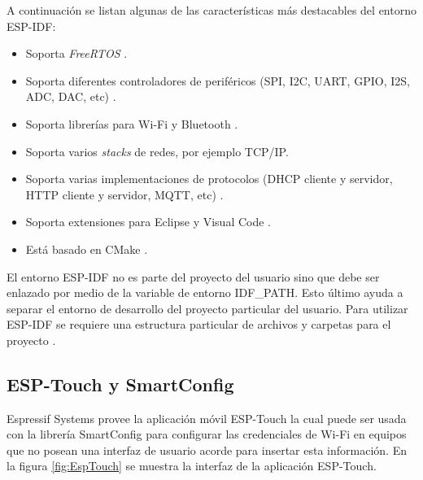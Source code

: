 A continuación se listan algunas de las características más destacables del entorno ESP-IDF:

\begin{itemize}
\item Soporta \textit{FreeRTOS} \citep{ESPIDF:FreeRTOS}.
\item Soporta diferentes controladores de periféricos (SPI, I2C, UART, GPIO, I2S, ADC, DAC, etc) \citep{ESPIDF:PER}.
\item Soporta librerías para Wi-Fi \citep{ESPIDF:WiFi} y Bluetooth \citep{ESPIDF:bluetooth}.
\item Soporta varios \textit{stacks} de redes, por ejemplo TCP/IP.
\item Soporta varias implementaciones de protocolos (DHCP cliente y servidor, HTTP cliente y servidor, MQTT, etc) \citep{ESPIDF:PRO}.
\item Soporta extensiones para Eclipse \citep{ESPIDF:ECLIPSE} y Visual Code \citep{ESPIDF:VC}.
\item Está basado en CMake \citep{ESPIDF:CMake}.
\end{itemize}

El entorno ESP-IDF no es parte del proyecto del usuario sino que debe ser enlazado por medio de la variable de entorno IDF\_PATH. Esto último ayuda a separar el entorno de desarrollo del proyecto particular del usuario. Para utilizar ESP-IDF se requiere una estructura particular de archivos y carpetas para el proyecto \citep{ESPIDF:CMake_2}. 

\subsection{ESP-Touch y SmartConfig}
\label{sec:ESPTouch}

Espressif Systems provee la aplicación móvil ESP-Touch \citep{ESPTOUCH} la cual puede ser usada con la librería SmartConfig \citep{SMARTCONFIG} para configurar las credenciales de Wi-Fi en equipos que no posean una interfaz de usuario acorde para insertar esta información. En la figura \ref{fig:EspTouch} se muestra la interfaz de la aplicación ESP-Touch.

